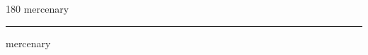 
\begin{frame}
\begin{center}
\begin{turn}{180}
{\fontsize{2.5cm}{1em}\selectfont mercenary}
\end{turn}
\vspace{1em}\par  
\hrule
\vspace{1em}\par  
{\fontsize{2.5cm}{1em}\selectfont mercenary}
\end{center}
\end{frame}
